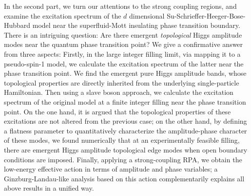 \begin{abstract*}
  In the second part, we turn our attentions to the strong coupling regions, and examine the excitation spectrum of the $d$ dimensional Su-Schrieffer-Heeger-Bose-Hubbard model near the superfluid-Mott insulating phase transition boundary. There is an intriguing question: Are there emergent \emph{topological} Higgs amplitude modes near the quantum phase transition point? We give a confirmative answer from three aspects: Firstly, in the large integer filling limit, via mapping it to a pseudo-spin-1 model, we calculate the excitation spectrum of the latter near the phase transition point. We find the emergent pure Higgs amplitude bands, whose topological properties are directly inherited from the underlying single-particle Hamiltonian. Then using a slave boson approach, we calculate the excitation spectrum of the original model at a finite integer filling near the phase transition point. On the one hand, it is argued that the topological properties of these excitations are not altered from the previous case; on the other hand, by defining a flatness parameter to quantitatively characterize the amplitude-phase character of these modes, we found numerically that at an experimentally feasible filling, there are emergent Higgs amplitude topological edge modes when open boundary conditions are imposed. Finally, applying a strong-coupling RPA, we obtain the low-energy effective action in terms of amplitude and phase variables; a Ginzburg-Landau-like analysis based on this action complementarily explains all above results in a unified way.
  

























































\end{abstract*}
